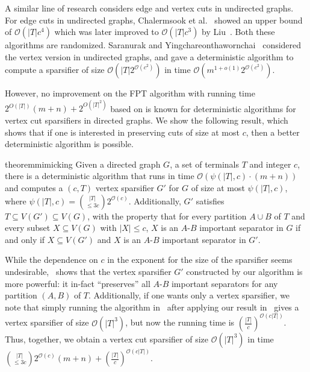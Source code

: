 \documentclass[11pt]{article}
\newcommand{\OO}{\mathcal{O}}
\begin{document}
A similar line of research considers edge and vertex cuts in undirected graphs. For edge cuts in undirected graphs, Chalermsook et al.~\cite{chalermsook2021vertex} showed an upper bound of $\OO(|T|c^4)$ which was later improved to $\OO(|T|c^3)$ by Liu~\cite{liu2023vertex}. Both these algorithms are randomized. Saranurak and Yingchareonthawornchai~\cite{saranurak2022deterministic} considered the vertex version in undirected graphs, and gave a deterministic algorithm to compute a sparsifier of size $\OO(|T|2^{\OO(c^2)})$ in time $\OO(m^{1 + o(1)}2^{\OO(c^2)})$. 

However, no improvement on the FPT algorithm with running time $2^{O(|T|)}(m + n) + 2^{O(|T|^2)}$ based on  is known for deterministic algorithms for vertex cut sparsifiers in directed graphs. We show the following result, which shows that if one is interested in preserving cuts of size at most $c$, then a better deterministic algorithm is possible.


\begin{restatable}{theorem}{mimicking}\label{thm:mimicking}
Given a directed graph $G$, a set of terminals $T$ and integer $c$, there is a deterministic algorithm that runs in time $\OO(\psi(|T|,c) \cdot (m + n))$ and computes a $(c,T)$ vertex sparsifier $G'$ for $G$ of size at most $\psi(|T|,c)$, where $\psi(|T|,c) = {|T| \choose \leq 3c} 2^{\OO(c)}$. Additionally, $G'$ satisfies $T \subseteq V(G') \subseteq V(G)$, with the property that for every partition $A \cup B$ of $T$ and every subset $X \subseteq V(G)$ with $|X| \leq c$, $X$ is an $A$-$B$ important separator in $G$ if and only if $X \subseteq V(G')$ and $X$ is an $A$-$B$ important separator in $G'$. 
\end{restatable}





While the dependence on $c$ in the exponent for the size of the sparsifier seems undesirable,~ shows that the vertex sparsifier $G'$ constructed by our algorithm is more powerful: it in-fact ``preserves'' all $A$-$B$ important separators for any partition $(A,B)$ of $T$. Additionally, if one wants only a vertex sparsifier, we note that simply running the algorithm in~ after applying our result in~ gives a vertex sparsifier of size $\OO(|T|^3)$, but now the running time is $\left(\frac{|T|}{c}\right )^{\OO(c|T|)}$. Thus, together, we obtain a vertex cut sparsifier of size $\OO(|T|^3)$ in time ${|T| \choose \leq 3c} 2^{\OO(c)}(m + n) + \left(\frac{|T|}{c}\right)^{\OO(c|T|)}$. 
\end{document}
